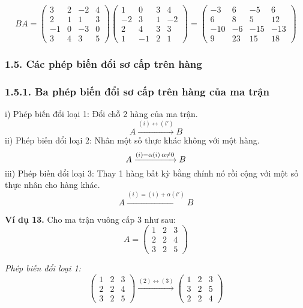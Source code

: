 \[
BA = \begin{pmatrix}
3 & 2 & -2 & 4 \\
2 & 1 & 1 & 3 \\
-1 & 0 & -3 & 0 \\
3 & 4 & 3 & 5
\end{pmatrix}
\begin{pmatrix}
1 & 0 & 3 & 4 \\
-2 & 3 & 1 & -2 \\
2 & 4 & 3 & 3 \\
1 & -1 & 2 & 1
\end{pmatrix}
= \begin{pmatrix}
-3 & 6 & -5 & 6 \\
6 & 8 & 5 & 12 \\
-10 & -6 & -15 & -13 \\
9 & 23 & 15 & 18
\end{pmatrix}
\]

\subsubsection*{1.5. Các phép biến đổi sơ cấp trên hàng}
\subsubsection*{1.5.1. Ba phép biến đổi sơ cấp trên hàng của ma trận}
i) Phép biến đổi loại 1: Đổi chỗ 2 hàng của ma trận.
\[
A \xrightarrow{(i) \leftrightarrow (i')} B
\]
ii) Phép biến đổi loại 2: Nhân một số thực khác không với một hàng.
\[
A \xrightarrow{(i)=\alpha(i) \\ \alpha \neq 0} B
\]
iii) Phép biến đổi loại 3: Thay 1 hàng bất kỳ bằng chính nó rồi cộng với một số thực nhân cho hàng khác.
\[
A \xrightarrow{(i)=(i)+\alpha(i')} B
\]

\textbf{Ví dụ 13.} Cho ma trận vuông cấp 3 như sau:
\[
A = \begin{pmatrix}
1 & 2 & 3 \\
2 & 2 & 4 \\
3 & 2 & 5
\end{pmatrix}
\]

\textit{Phép biến đổi loại 1:}
\[
\begin{pmatrix}
1 & 2 & 3 \\
2 & 2 & 4 \\
3 & 2 & 5
\end{pmatrix}
\xrightarrow{(2) \leftrightarrow (3)}
\begin{pmatrix}
1 & 2 & 3 \\
3 & 2 & 5 \\
2 & 2 & 4
\end{pmatrix}
\]

